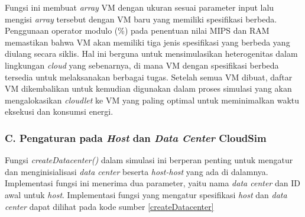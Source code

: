 Fungsi ini membuat \textit{array} VM dengan ukuran sesuai parameter input lalu mengisi \textit{array} tersebut dengan VM baru yang memiliki spesifikasi berbeda. Penggunaan operator modulo (\%) pada penentuan nilai MIPS dan RAM memastikan bahwa VM akan memiliki tiga jenis spesifikasi yang berbeda yang diulang secara siklis. Hal ini berguna untuk mensimulasikan heterogenitas dalam lingkungan \textit{cloud} yang sebenarnya, di mana VM dengan spesifikasi berbeda tersedia untuk melaksanakan berbagai tugas. Setelah semua VM dibuat, daftar VM dikembalikan untuk kemudian digunakan dalam proses simulasi yang akan mengalokasikan \textit{cloudlet} ke VM yang paling optimal untuk meminimalkan waktu eksekusi dan konsumsi energi.

\subsubsection{C. Pengaturan pada \textit{Host} dan \textit{Data Center} CloudSim}
Fungsi \textit{createDatacenter()} dalam simulasi ini berperan penting untuk mengatur dan menginisialisasi \textit{data center} beserta \textit{host-host} yang ada di dalamnya. Implementasi fungsi ini menerima dua parameter, yaitu nama \textit{data center} dan ID awal untuk \textit{host}. Implementasi fungsi yang mengatur spesifikasi \textit{host} dan \textit{data center} dapat dilihat pada kode sumber \ref{createDatacenter}

